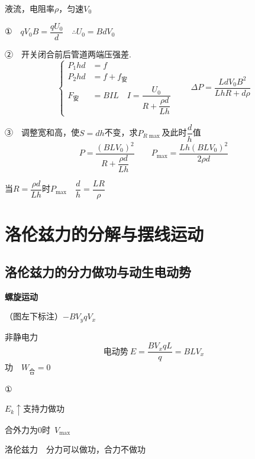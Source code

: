 \begin{problem}
\noindent 液流，电阻率$\rho$，匀速$V_0$

\noindent ①　$qV_0B=\dfrac{qU_0}{d}$　$\therefore U_0=BdV_0$

\noindent ②　开关闭合前后管道两端压强差.
\[ \left\{\begin{aligned}
P_1hd&=f\\
P_2hd&=f+f_{\text{安}}\\
F_{\text{安}}&=BIL\quad I=\dfrac{U_0}{R+\dfrac{\rho d}{Lh}}
\end{aligned}\right.\qquad \Delta P=\dfrac{LdV_0B^2}{LhR+d\rho} \]%

\noindent ③　调整宽和高，使$S=dh$不变，求$P_{R\max}$及此时$\dfrac{d}{h}$值
\[ P=\dfrac{(BLV_0)^2}{R+\dfrac{\rho d}{Lh}}\qquad P_{\max}=\dfrac{Lh(BLV_0)^2}{2\rho d} \]%

\noindent 当$R=\dfrac{\rho d}{Lh}$时$P_{\max}$　$\dfrac{d}{h}=\dfrac{LR}{\rho}$
\end{problem}


\section{洛伦兹力的分解与摆线运动}
\subsection{洛伦兹力的分力做功与动生电动势}
\textbf{螺旋运动}

（图左下标注）$-BV_yqV_x$

非静电力
\[
\text{电动势}\ E=\frac{BV_xqL}{q}=BLV_x
\]
功　$W_{\text{合}}=0$

①

$E_{k}\uparrow$\quad 支持力做功

合外力为0时\ $V_{\max}$

\noindent 洛伦兹力　分力可以做功，合力不做功

